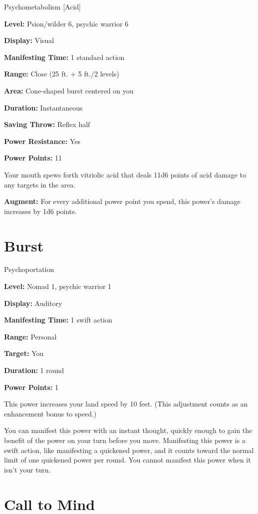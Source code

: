 \documentclass{article}
\begin{document}
Psychometabolism [Acid]

\textbf{Level:} Psion/wilder 6, psychic warrior 6

\textbf{Display:} Visual

\textbf{Manifesting Time:} 1 standard action

\textbf{Range:} Close (25 ft. + 5 ft./2 levels)

\textbf{Area:} Cone-shaped burst centered on you

\textbf{Duration:} Instantaneous

\textbf{Saving Throw:} Reflex half

\textbf{Power Resistance:} Yes

\textbf{Power Points:} 11

Your mouth spews forth vitriolic acid that deals 11d6 points of acid damage to 
any targets in the area.

\textbf{Augment:} For every additional power point you spend, this power's damage 
increases by 1d6 points.

\vspace{12pt}
\section*{Burst}

Psychoportation

\textbf{Level:} Nomad 1, psychic warrior 1

\textbf{Display:} Auditory

\textbf{Manifesting Time:} 1 swift action

\textbf{Range:} Personal

\textbf{Target:} You

\textbf{Duration:} 1 round

\textbf{Power Points:} 1

This power increases your land speed by 10 feet. (This adjustment counts as an 
enhancement bonus to speed.)

You can manifest this power with an instant thought, quickly enough to gain the 
benefit of the power on your turn before you move. Manifesting this power is a 
swift action, like manifesting a quickened power, and it counts toward the normal 
limit of one quickened power per round. You cannot manifest this power when it 
isn't your turn.

\vspace{12pt}
\section*{Call to Mind}
\end{document}
